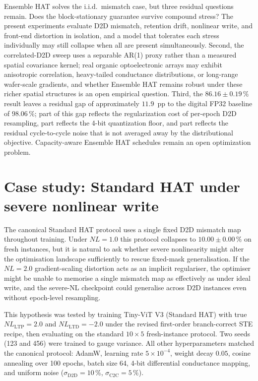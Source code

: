Ensemble HAT solves the i.i.d.~mismatch case, but three residual questions remain.  Does the block-stationary guarantee survive compound stress?  The present experiments evaluate D2D mismatch, retention drift, nonlinear write, and front-end distortion in isolation, and a model that tolerates each stress individually may still collapse when all are present simultaneously.  Second, the correlated-D2D sweep uses a separable AR(1) proxy rather than a measured spatial covariance kernel; real organic optoelectronic arrays may exhibit anisotropic correlation, heavy-tailed conductance distributions, or long-range wafer-scale gradients, and whether Ensemble HAT remains robust under these richer spatial structures is an open empirical question.  Third, the $86.16\pm0.19\,\%$ result leaves a residual gap of approximately $11.9$~pp to the digital FP32 baseline of $98.06\,\%$; part of this gap reflects the regularization cost of per-epoch D2D resampling, part reflects the 4-bit quantization floor, and part reflects the residual cycle-to-cycle noise that is not averaged away by the distributional objective.  Capacity-aware Ensemble HAT schedules remain an open optimization problem.


\section{Case study: Standard HAT under severe nonlinear write}
\label{sec:case-severe-nl-standard}

The canonical Standard HAT protocol uses a single fixed D2D mismatch map throughout training.  Under $NL=1.0$ this protocol collapses to $10.00\pm0.00\,\%$ on fresh instances, but it is natural to ask whether severe nonlinearity might alter the optimisation landscape sufficiently to rescue fixed-mask generalisation.  If the $NL=2.0$ gradient-scaling distortion acts as an implicit regulariser, the optimiser might be unable to memorise a single mismatch map as effectively as under ideal write, and the severe-NL checkpoint could generalise across D2D instances even without epoch-level resampling.

This hypothesis was tested by training Tiny-ViT V3 (Standard HAT) with true $NL_{\mathrm{LTP}}=2.0$ and $NL_{\mathrm{LTD}}=-2.0$ under the revised first-order branch-correct STE recipe, then evaluating on the standard $10 \times 5$ fresh-instance protocol.  Two seeds (123 and 456) were trained to gauge variance.  All other hyperparameters matched the canonical protocol: AdamW, learning rate $5\times10^{-4}$, weight decay $0.05$, cosine annealing over 100 epochs, batch size 64, 4-bit differential conductance mapping, and uniform noise ($\sigma_{\mathrm{D2D}}=10\,\%$, $\sigma_{\mathrm{C2C}}=5\,\%$).

